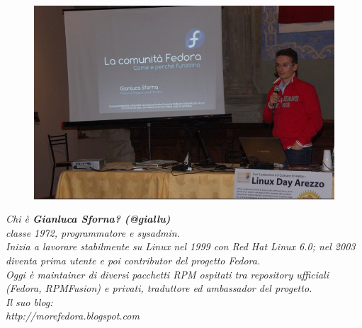 \begin{figure}[htbp]
\centering
\includegraphics[scale=.35]{articoli/varie/immagini/giallu.jpg}\\
\end{figure}
\singlespacing
{}
\begin{shaded}
{\footnotesize
\color[cmyk]{1, 0.57, 0, 0.38}
\emph{Chi è \textbf{Gianluca Sforna? (@giallu)}\\
classe 1972, programmatore e sysadmin.\\
Inizia a lavorare stabilmente su Linux nel 1999 con Red Hat Linux 6.0;
nel 2003 diventa prima utente e poi contributor del progetto Fedora.\\
Oggi è maintainer di diversi pacchetti RPM ospitati tra repository
ufficiali (Fedora, RPMFusion) e privati, traduttore ed ambassador del
progetto.\\ Il suo blog: \\http://morefedora.blogspot.com}
}
\end{shaded}
